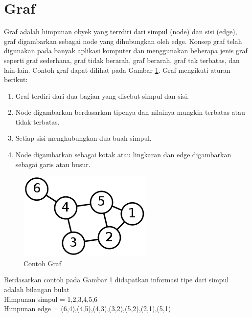 \section{Graf}
Graf adalah himpunan obyek yang terrdiri dari simpul (node) dan sisi (edge), graf 
digambarkan sebagai node yang dihubungkan oleh edge. Konsep graf telah digunakan pada 
banyak aplikasi komputer dan menggunakan beberapa jenis graf seperti graf sederhana, graf 
tidak berarah, graf berarah, graf tak terbatas, dan lain-lain. Contoh graf dapat
dilihat pada Gambar \ref{fig:graph}. Graf mengikuti aturan berikut:
\begin{enumerate}
\item Graf terdiri dari dua bagian yang disebut simpul dan sisi.
\item Node digambarkan berdasarkan tipenya dan nilainya mungkin terbatas atau
tidak terbatas. 
\item Setiap sisi menghubungkan dua buah simpul.
\item Node digambarkan sebagai kotak atau lingkaran dan edge digambarkan sebagai
garis atau busur.
\end{enumerate}
\begin{figure}[h]
\centering
\includegraphics[scale=0.8]{Gambar/graph}
\caption[Contoh Graf]{Contoh Graf}
\label{fig:graph}
\end{figure}
Berdasarkan contoh pada Gambar \ref{fig:graph}  didapatkan informasi tipe dari
simpul adalah bilangan bulat \\
Himpunan simpul = {1,2,3,4,5,6} \\ 
Himpunan edge = {(6,4),(4,5),(4,3),(3,2),(5,2),(2,1),(5,1)}

